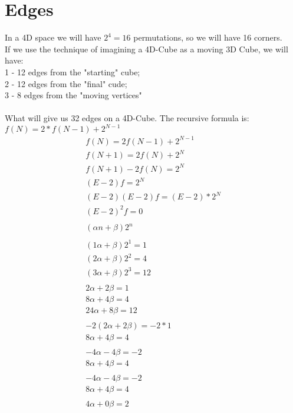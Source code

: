 \documentclass[12pt]{article}
\begin{document}
	\section{Edges}
	In a 4D space we will have $2^4=16$ permutations, so we will have 16 corners.\\
	If we use the technique of imagining a 4D-Cube as a moving 3D Cube, we will have:\\
	1 - 12 edges from the "starting" cube;\\
	2 - 12 edges from the "final" cude;\\
	3 - 8 edges from the "moving vertices"\\
	\\
	What will give us 32 edges on a 4D-Cube.
	\newpage
	The recursive formula is: $f(N) = 2*f(N-1) + 2^{N-1}$
	\\
	\begin{align*}
		f(N) = 2f(N-1)+2^{N-1}\\
		f(N+1) = 2f(N)+2^{N}\\
		f(N+1) - 2f(N) = 2^{N}\\
		(E-2)f = 2^{N}\\
		(E-2)(E-2)f = (E-2)*2^{N}\\
		(E-2)^2f = 0\\
		\\
		(\alpha n + \beta)2^n\\
		\\
		(1\alpha + \beta)2^1 = 1\\
		(2\alpha + \beta)2^2 = 4\\
		(3\alpha + \beta)2^3 = 12\\
		\\
		2\alpha + 2\beta = 1\\
		8\alpha + 4\beta = 4\\
		24\alpha + 8\beta = 12\\
		\\
		-2(2\alpha + 2\beta) = -2*1\\			
		8\alpha + 4\beta = 4\\
		\\
		-4\alpha - 4\beta = -2\\			
		8\alpha + 4\beta = 4\\
		\\
		-4\alpha - 4\beta = -2\\			
		8\alpha + 4\beta = 4\\		
		\\
		4\alpha + 0\beta = 2\\
		\\
	\end{align*}
\end{document}
